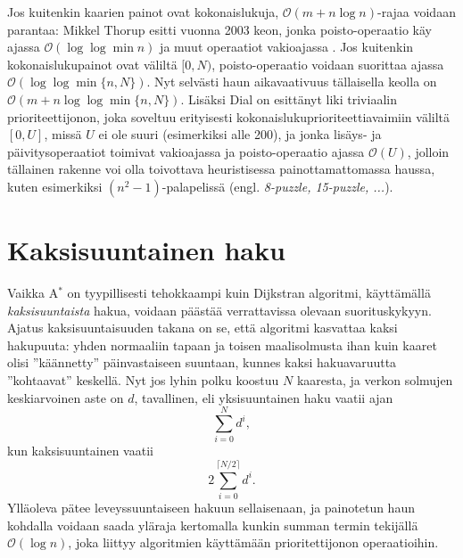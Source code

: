 \documentclass[finnish]{tktltiki2}
\theoremstyle{definition}
\theoremstyle{remark}
\begin{document}
Jos kuitenkin kaarien painot ovat kokonaislukuja, $\mathcal{O}(m + n \log n)$-rajaa voidaan parantaa:
Mikkel Thorup esitti vuonna 2003 keon, jonka poisto-operaatio käy ajassa $\mathcal{O}(\log \log \min n)$ ja muut operaatiot vakioajassa \cite{Thorup03}. Jos kuitenkin kokonaislukupainot ovat väliltä $[0, N)$, poisto-operaatio voidaan suorittaa ajassa $\mathcal{O}(\log \log \min \{ n, N \})$. Nyt selvästi haun aikavaativuus tällaisella keolla on $\mathcal{O}(m + n \log \log \min \{n, N \})$. Lisäksi Dial on esittänyt liki triviaalin prioriteettijonon, joka soveltuu erityisesti kokonaislukuprioriteettiavaimiin väliltä $[0, U]$, missä $U$ ei ole suuri (esimerkiksi alle 200), ja jonka lisäys- ja päivitysoperaatiot toimivat vakioajassa ja poisto-operaatio ajassa $\mathcal{O}(U)$, jolloin tällainen rakenne voi olla toivottava heuristisessa painottamattomassa haussa, kuten esimerkiksi $(n^2 - 1)$-palapelissä (engl. \textit{8-puzzle, 15-puzzle, ...}).

\section{Kaksisuuntainen haku}
Vaikka A$^{\ast}$ on tyypillisesti tehokkaampi kuin Dijkstran algoritmi, käyttämällä \textit{kaksisuuntaista} hakua, voidaan päästää verrattavissa olevaan suorituskykyyn. Ajatus kaksisuuntaisuuden takana on se, että algoritmi kasvattaa kaksi hakupuuta: yhden normaaliin tapaan ja toisen maalisolmusta ihan kuin kaaret olisi ''käännetty'' päinvastaiseen suuntaan, kunnes kaksi hakuavaruutta ''kohtaavat'' keskellä. Nyt jos lyhin polku koostuu $N$ kaaresta, ja verkon solmujen keskiarvoinen aste on $d$, tavallinen, eli yksisuuntainen haku vaatii ajan
\[
\sum_{i = 0}^N d^i,
\]
kun kaksisuuntainen vaatii
\[
2 \sum_{i = 0}^{\lceil N / 2 \rceil} d^i.
\]
Ylläoleva pätee leveyssuuntaiseen hakuun sellaisenaan, ja painotetun haun kohdalla voidaan saada yläraja kertomalla kunkin summan termin tekijällä $\mathcal{O}(\log n)$, joka liittyy algoritmien käyttämään prioritettijonon operaatioihin. 
\end{document}
